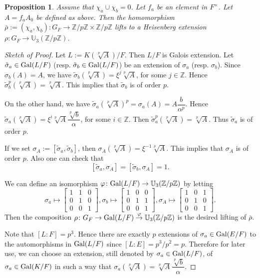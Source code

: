 \documentclass[12pt,leqno]{amsart}
\theoremstyle{plain}
\newtheorem{prop}[thm]{Proposition}
\theoremstyle{definition}
\newcommand{\U}{{\mathbb U}}
\newcommand{\Z}{{\mathbb Z}}
\begin{document}
\begin{prop}
\label{prop:Heisenberg extension}
Assume that $\chi_a\cup \chi_b=0$. Let $f_a$ be an element in $F^\times$. Let  $A=f_aA_0$ be defined as above. Then the homomorphism $\bar{\rho}:= (\chi_a,\chi_b)\colon G_F\to \Z/p\Z\times \Z/p\Z$ lifts to a Heisenberg extension $\rho\colon G_F\to \U_3(\Z/p\Z)$. 
\end{prop}
\begin{proof}[Sketch of Proof] 
Let $L:=K(\sqrt[p]{A})/F$. Then $L/F$ is Galois extension. 
Let $\tilde{\sigma}_a\in {\rm Gal}(L/F)$ (resp. $\tilde{\sigma}_b\in {\rm Gal}(L/F)$) be an extension of $\sigma_a$ (resp. $\sigma_b$). Since $\sigma_b(A)=A$, we have $\tilde{\sigma}_b(\sqrt[p]{A})=\xi^j\sqrt[p]{A}$, for some $j\in \Z$. 
Hence $\tilde{\sigma}_b^p(\sqrt[p]{A})=\sqrt[p]{A}$. This implies that $\tilde{\sigma}_b$ is of order $p$.

On the other hand, we have 
$
\tilde{\sigma}_a(\sqrt[p]{A})^p=\sigma_a(A) =A \dfrac{b}{\alpha^p}.
$
Hence $\tilde{\sigma}_a(\sqrt[p]{A})=\xi^i \sqrt[p]{A}\dfrac{\sqrt[p]{b}}{\alpha}$, for some $i\in \Z$. Then $\tilde{\sigma}_a^{p}(\sqrt[p]{A})=\sqrt[p]{A}$. Thus $\tilde{\sigma}_a$ is of order $p$. 

If we set $\sigma_A:=[\tilde{\sigma}_a,\tilde{\sigma}_b]$, then $\sigma_A(\sqrt[p]{A})=\xi^{-1} \sqrt[p]{A}$. This implies that $\sigma_A$ is of order $p$. Also one can check that
\[
[\tilde{\sigma}_a,\sigma_A]=[\tilde{\sigma}_b,\sigma_A]=1.
\]

We can define an isomorphism $\varphi \colon {\rm Gal}(L/F)\to \U_3(\Z/p\Z)$ by letting
\[
\sigma_a \mapsto \begin{bmatrix}
1& 1 & 0 \\
0& 1 & 0 \\
0& 0 & 1
\end{bmatrix},
\sigma_b\mapsto 
\begin{bmatrix}
1& 0 & 0 \\
0& 1 & 1 \\
0& 0 & 1 
\end{bmatrix},
\sigma_{A}\mapsto 
\begin{bmatrix}
1& 0 & 1 \\
0& 1 & 0 \\
0& 0 & 1 
\end{bmatrix}.
\]
Then the composition $\rho\colon G_F\to {\rm Gal}(L/F)\stackrel{\varphi}{\to} \U_3(\Z/p\Z)$ is the desired lifting of $\bar{\rho}$. 

Note that $[L:F]=p^3$. Hence there are exactly $p$ extensions of $\sigma_a\in {\rm Gal}(E/F)$ to the automorphisms in ${\rm Gal}(L/F)$ since $[L:E]=p^3/p^2=p$. Therefore for later use,  we can choose an extension, still denoted by $\sigma_a\in {\rm Gal}(L/F)$, of $\sigma_a\in {\rm Gal}(K/F)$ in such a way that $\sigma_a(\sqrt[p]{A})= \sqrt[p]{A}\dfrac{\sqrt[p]{b}}{\alpha}$. 
\end{proof}
\end{document}
